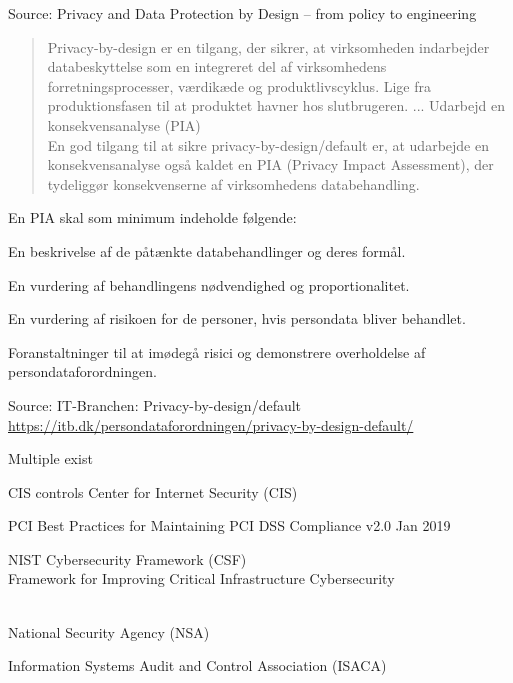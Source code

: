 \documentclass[Screen16to9,17pt]{foils}
\begin{document}
Source: Privacy and Data Protection by Design -- from policy to engineering




\begin{quote}\small
Privacy-by-design er en tilgang, der sikrer, at virksomheden indarbejder databeskyttelse som en integreret del af virksomhedens forretningsprocesser, værdikæde og produktlivscyklus. Lige fra produktionsfasen til at produktet havner hos slutbrugeren.
...
Udarbejd en konsekvensanalyse (PIA)\\
En god tilgang til at sikre privacy-by-design/default er, at udarbejde en konsekvensanalyse også kaldet en PIA (Privacy Impact Assessment), der tydeliggør konsekvenserne af virksomhedens databehandling.
\end{quote}

En PIA skal som minimum indeholde følgende:

\begin{list2}
\item En beskrivelse af de påtænkte databehandlinger og deres formål.
\item En vurdering af behandlingens nødvendighed og proportionalitet.
\item En vurdering af risikoen for de personer, hvis persondata bliver behandlet.
\item Foranstaltninger til at imødegå risici og demonstrere overholdelse af persondataforordningen.
\end{list2}

Source: IT-Branchen: Privacy-by-design/default\\ \url{https://itb.dk/persondataforordningen/privacy-by-design-default/}



\begin{list1}
\item Multiple exist
\vskip 1cm
\begin{list2}
\item CIS controls Center for Internet Security (CIS) 
\item PCI Best Practices for Maintaining PCI DSS Compliance v2.0 Jan 2019
\item NIST Cybersecurity Framework (CSF)\\
Framework for Improving
Critical Infrastructure Cybersecurity\\ \\
\item National Security Agency (NSA)\\ 
\item Information Systems Audit and Control Association (ISACA)\\
\end{list2}
\end{list1}
\end{document}

